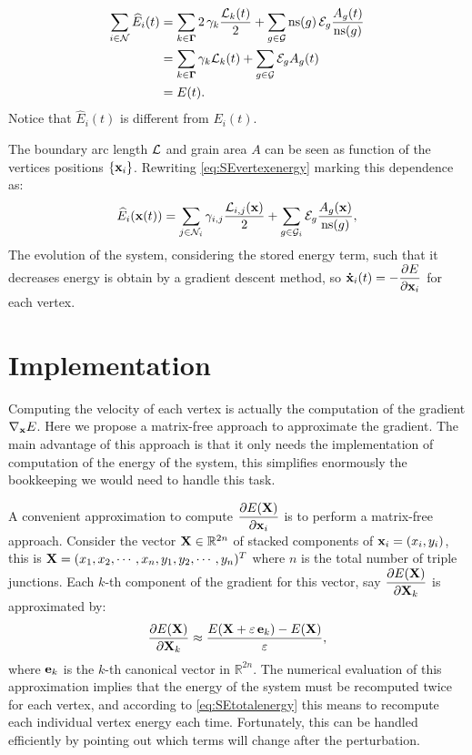  \begin{align*}
     \sum_{i \in \mathcal{N}}\widehat{E}_i(t) &= \sum_{k \in \bm{\Gamma}}2\,\gamma_{k}\dfrac{\mathcal{L}_{k}(t)}{2} + 
     \sum_{g \in \mathcal{G}} \operatorname{ns}(g)\,\mathcal{E}_{g}\dfrac{A_{g}(t)}{\operatorname{ns}(g)}\\
      &= \sum_{k \in \bm{\Gamma}}\gamma_{k}\mathcal{L}_{k}(t) + 
     \sum_{g \in \mathcal{G}} \mathcal{E}_{g}A_{g}(t) \nonumber\\
     &=E(t).
 \end{align*}
Notice that $\widehat{E}_i(t)$ is different
from $E_i(t)$.

The boundary arc length $\mathcal{L}$ and grain area $A$ can be seen as function of the vertices positions $\{\x_i\}$. Rewriting \eqref{eq:SEvertexenergy} marking this dependence as:
\begin{equation}
    \widehat{E}_i(\x(t)) = \sum_{j \in \mathcal{N}_i}\gamma_{i,j}\dfrac{\AL_{i,j}(\x)}{2} + \sum_{g \in \mathcal{G}_i} \SE_{g}\dfrac{A_{g}(\x)}{\ns(g)},\label{eq:vertexenergy}
\end{equation}
The evolution of the system, considering the stored energy term, such that it decreases energy
is obtain by a gradient descent method, so
$\dotx_i(t) = -\dfrac{\partial E}{\partial \x_i}$ for each vertex.

\section{Implementation}
Computing the velocity of each vertex is actually the computation of the gradient $\nabla_{\x}E$. 
Here we propose a matrix-free approach to approximate the gradient.
The main advantage of this approach is that it only needs the implementation of computation of the energy of the system, this simplifies enormously the bookkeeping we would need to handle this task.

A convenient approximation to compute $\dfrac{\partial E(\X)}{\partial \x_i}$ is to perform a matrix-free approach. 
Consider the vector $\X \in \mathbb{R}^{2n}$ of stacked components of $\x_i =(x_i, y_i)$, this is $\X = (x_1, x_2, \cdots, x_n, y_1, y_2, \cdots, y_n)^T$ where $n$ is the total number of triple junctions. 
Each $k$-th component of the gradient for this vector, say $\dfrac{\partial E(\X)}{\partial \X_k}$ is approximated by:
\begin{equation}
    \frac{\partial E(\X)}{\partial \X_k} \approx 
    \frac{E(\X + \varepsilon\,  \ei{k}) - E(\X)}{\varepsilon},
    \label{eq:partialE}
\end{equation}
where $\mathbf{e}_{k}$ is the $k$-th canonical vector in $\mathbb{R}^{2n}$. 
The numerical evaluation of this approximation implies that the energy of the system must be recomputed twice for each vertex, and according to \eqref{eq:SEtotalenergy} this means to recompute each individual vertex energy each time.
Fortunately, 
this can be handled efficiently by pointing out which terms will change after the perturbation.

